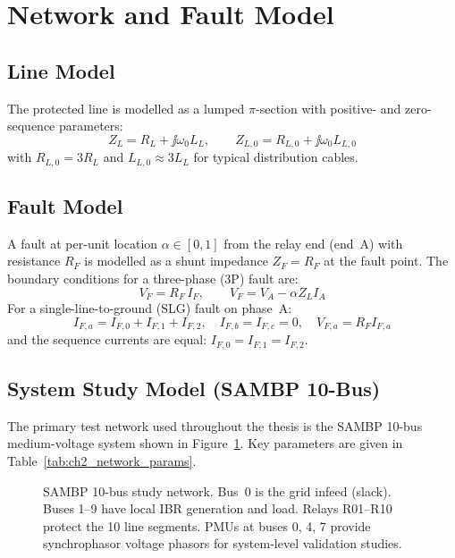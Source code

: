 \section{Network and Fault Model}
\label{sec:ch2_network}

\subsection{Line Model}

The protected line is modelled as a lumped $\pi$-section with positive- and
zero-sequence parameters:
\begin{equation}
  Z_L = R_L + \jj\omega_0 L_L, \qquad
  Z_{L,0} = R_{L,0} + \jj\omega_0 L_{L,0}
  \label{eq:ch2_line_z}
\end{equation}
with $R_{L,0} = 3R_L$ and $L_{L,0} \approx 3L_L$ for typical distribution cables.

\subsection{Fault Model}

A fault at per-unit location $\alpha \in [0, 1]$ from the relay end (end~A)
with resistance $R_F$ is modelled as a shunt impedance $Z_F = R_F$ at the
fault point. The boundary conditions for a three-phase (3P) fault are:
\begin{equation}
  V_F = R_F\, I_F, \qquad V_F = V_A - \alpha Z_L I_A
  \label{eq:ch2_3p_fault}
\end{equation}
For a single-line-to-ground (SLG) fault on phase~A:
\begin{equation}
  I_{F,a} = I_{F,0} + I_{F,1} + I_{F,2}, \quad
  I_{F,b} = I_{F,c} = 0, \quad
  V_{F,a} = R_F I_{F,a}
  \label{eq:ch2_slg_fault}
\end{equation}
and the sequence currents are equal: $I_{F,0} = I_{F,1} = I_{F,2}$.

\subsection{System Study Model (SAMBP 10-Bus)}

The primary test network used throughout the thesis is the SAMBP 10-bus
medium-voltage system shown in Figure~\ref{fig:ch2_study_network}.
Key parameters are given in Table~\ref{tab:ch2_network_params}.

\begin{figure}[htbp]
  \centering
  
  \caption{SAMBP 10-bus study network. Bus~0 is the grid infeed (slack).
           Buses 1--9 have local IBR generation and load.
           Relays R01--R10 protect the 10 line segments.
           PMUs at buses 0, 4, 7 provide synchrophasor voltage phasors for
           system-level validation studies.}
  \label{fig:ch2_study_network}
\end{figure}

